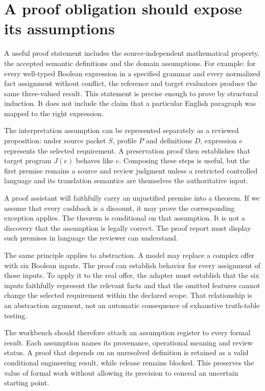 \section{A proof obligation should expose its assumptions}
\label{merge:M03:03}


A useful proof statement includes the source-independent mathematical property,
the accepted semantic definitions and the domain assumptions. For example:
for every well-typed Boolean expression in a specified grammar and every normalized
fact assignment without conflict, the reference and target evaluators produce
the same three-valued result. This statement is precise enough to prove by
structural induction. It does not include the claim that a particular English
paragraph was mapped to the right expression.

The interpretation assumption can be represented separately as a reviewed
proposition: under source packet $S$, profile $P$ and definitions $D$, expression
$e$ represents the selected requirement. A preservation proof then establishes
that target program $J(e)$ behaves like $e$. Composing these steps is useful, but
the first premise remains a source and review judgment unless a restricted
controlled language and its translation semantics are themselves the authoritative
input.


A proof assistant will faithfully carry an unjustified premise into a theorem.
If we assume that every cashback is a discount, it may prove the corresponding
exception applies. The theorem is conditional on that assumption. It is not a
discovery that the assumption is legally correct. The proof report must display
such premises in language the reviewer can understand.

The same principle applies to abstraction. A model may replace a complex offer
with six Boolean inputs. The proof can establish behavior for every assignment
of those inputs. To apply it to the real offer, the adapter must establish that
the six inputs faithfully represent the relevant facts and that the omitted
features cannot change the selected requirement within the declared scope.
That relationship is an abstraction argument, not an automatic consequence of
exhaustive truth-table testing.

The workbench should therefore attach an assumption register to every formal
result. Each assumption names its provenance, operational meaning and review
status. A proof that depends on an unresolved definition is retained as a valid
conditional engineering result, while release remains blocked. This preserves
the value of formal work without allowing its precision to conceal an uncertain
starting point.

